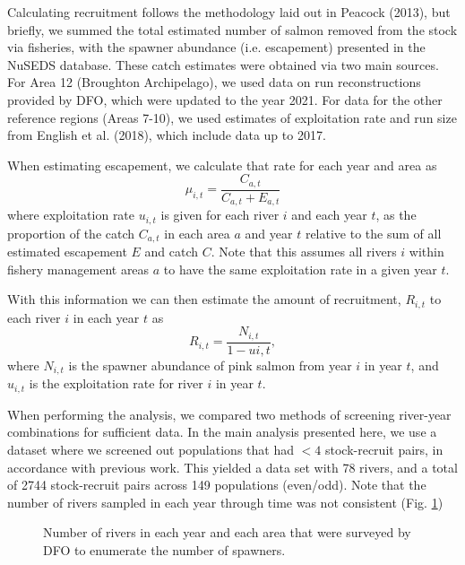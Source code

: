\documentclass{article}
\begin{document}
Calculating recruitment follows the methodology laid out in Peacock (2013), but briefly, we summed the total estimated number of salmon removed from the stock via fisheries, with the spawner abundance (i.e. escapement) presented in the NuSEDS database. These catch estimates were obtained via two main sources. For Area 12 (Broughton Archipelago), we used data on run reconstructions provided by DFO, which were updated to the year 2021. For data for the other reference regions (Areas 7-10), we used estimates of exploitation rate and run size from English et al. (2018), which include data up to 2017. 

When estimating escapement, we calculate that rate for each year and area as $$\mu_{i,t} = \frac{C_{a,t}}{C_{a,t} + E_{a,t}}$$ where exploitation rate $u_{i,t}$ is given for each river $i$ and each year $t$, as the proportion of the catch $C_{a,t}$ in each area $a$ and year $t$ relative to the sum of all estimated escapement $E$ and catch $C$. Note that this assumes all rivers $i$ within fishery management areas $a$ to have the same exploitation rate in a given year $t$.

With this information we can then estimate the amount of recruitment, $R_{i,t}$ to each river $i$ in each year $t$ as $$R_{i,t} = \frac{N_{i,t}}{1 - u{i,t}},$$ where $N_{i,t}$ is the spawner abundance of pink salmon from year $i$ in year $t$, and $u_{i,t}$ is the exploitation rate for river $i$ in year $t$. 

When performing the analysis, we compared two methods of screening river-year combinations for sufficient data. In the main analysis presented here, we use a dataset where we screened out populations that had $<4$ stock-recruit pairs, in accordance with previous work. This yielded a data set with 78 rivers, and a total of 2744 stock-recruit pairs across 149 populations (even/odd). Note that the number of rivers sampled in each year through time was not consistent (Fig. \ref{fig:cutof-comp})

\begin{figure}[h]
    \centering
    \caption{Number of rivers in each year and each area that were surveyed by DFO to enumerate the number of spawners.}
    \label{fig:cutof-comp}
\end{figure} 
\end{document}
